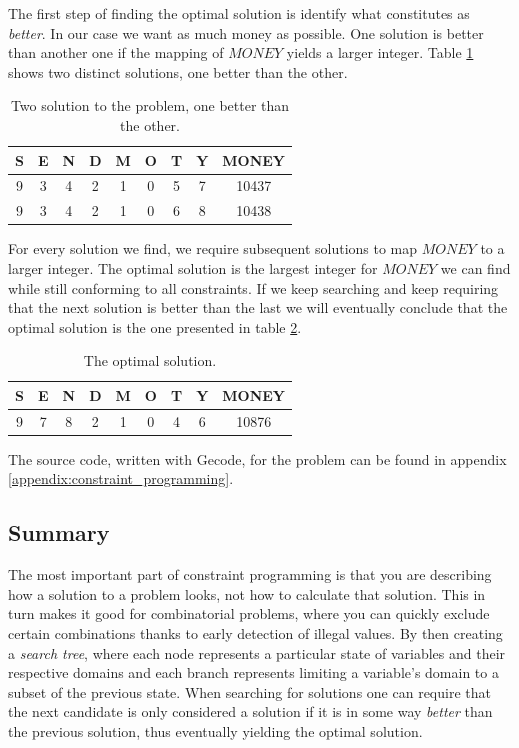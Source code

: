 The first step of finding the optimal solution is identify what constitutes as \textit{
	better}. In our case we want as much money as possible. One solution is better than
another one if the mapping of $MONEY$ yields a larger integer. Table \ref{tab:two_solutions}
shows two distinct solutions, one better than the other.

\begin{table}
	\centering
	\begin{tabular}{c|c|c|c|c|c|c|c|c}
		S & E & N & D & M & O & T & Y & MONEY \\
		\hline
		9 & 3 & 4 & 2 & 1 & 0 & 5 & 7 & 10437 \\
		9 & 3 & 4 & 2 & 1 & 0 & 6 & 8 & 10438 \\
	\end{tabular}
	\caption{Two solution to the problem, one better than the other.}
	\label{tab:two_solutions}
\end{table}

For every solution we find, we require subsequent solutions to map $MONEY$ to a larger
integer. The optimal solution is the largest integer for $MONEY$ we can find while still
conforming to all constraints. If we keep searching and keep requiring that the next solution
is better than the last we will eventually conclude that the optimal solution is the one
presented in table \ref{tab:optimal_solution}.

\begin{table}
	\centering
	\begin{tabular}{c|c|c|c|c|c|c|c|c}
		S & E & N & D & M & O & T & Y & MONEY \\
		\hline
		9 & 7 & 8 & 2 & 1 & 0 & 4 & 6 & 10876 \\
	\end{tabular}
	\caption{The optimal solution.}
	\label{tab:optimal_solution}
\end{table}

The source code, written with Gecode, for the problem can be found in appendix
\ref{appendix:constraint_programming}.

\subsection{Summary}
The most important part of constraint programming is that you are describing how a
solution to a problem looks, not how to calculate that solution. This in turn makes it
good for combinatorial problems, where you can quickly exclude certain combinations thanks
to early detection of illegal values. By then creating a \textit{search tree}, where each
node represents a particular state of variables and their respective domains and each
branch represents limiting a variable's domain to a subset of the previous state. When
searching for solutions one can require that the next candidate is only considered a solution
if it is in some way \textit{better} than the previous solution, thus eventually yielding
the optimal solution.
